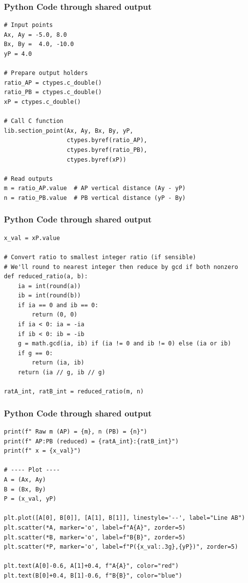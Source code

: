 \documentclass{beamer}
\begin{document}
\begin{frame}[fragile]
	\frametitle{Python Code through shared output}
	\begin{lstlisting}
# Input points
Ax, Ay = -5.0, 8.0
Bx, By =  4.0, -10.0
yP = 4.0

# Prepare output holders
ratio_AP = ctypes.c_double()
ratio_PB = ctypes.c_double()
xP = ctypes.c_double()

# Call C function
lib.section_point(Ax, Ay, Bx, By, yP,
                  ctypes.byref(ratio_AP),
                  ctypes.byref(ratio_PB),
                  ctypes.byref(xP))

# Read outputs
m = ratio_AP.value  # AP vertical distance (Ay - yP)
n = ratio_PB.value  # PB vertical distance (yP - By)
\end{lstlisting}
\end{frame}
\begin{frame}[fragile]
	\frametitle{Python Code through shared output}
	\begin{lstlisting}
x_val = xP.value

# Convert ratio to smallest integer ratio (if sensible)
# We'll round to nearest integer then reduce by gcd if both nonzero
def reduced_ratio(a, b):
    ia = int(round(a))
    ib = int(round(b))
    if ia == 0 and ib == 0:
        return (0, 0)
    if ia < 0: ia = -ia
    if ib < 0: ib = -ib
    g = math.gcd(ia, ib) if (ia != 0 and ib != 0) else (ia or ib)
    if g == 0:
        return (ia, ib)
    return (ia // g, ib // g)

ratA_int, ratB_int = reduced_ratio(m, n)
\end{lstlisting}
\end{frame}
\begin{frame}[fragile]
	\frametitle{Python Code through shared output}
	\begin{lstlisting}
print(f" Raw m (AP) = {m}, n (PB) = {n}")
print(f" AP:PB (reduced) = {ratA_int}:{ratB_int}")
print(f" x = {x_val}")

# ---- Plot ----
A = (Ax, Ay)
B = (Bx, By)
P = (x_val, yP)

plt.plot([A[0], B[0]], [A[1], B[1]], linestyle='--', label="Line AB")
plt.scatter(*A, marker='o', label=f"A{A}", zorder=5)
plt.scatter(*B, marker='o', label=f"B{B}", zorder=5)
plt.scatter(*P, marker='o', label=f"P({x_val:.3g},{yP})", zorder=5)

plt.text(A[0]-0.6, A[1]+0.4, f"A{A}", color="red")
plt.text(B[0]+0.4, B[1]-0.6, f"B{B}", color="blue")
\end{lstlisting}
\end{frame}
\end{document}
